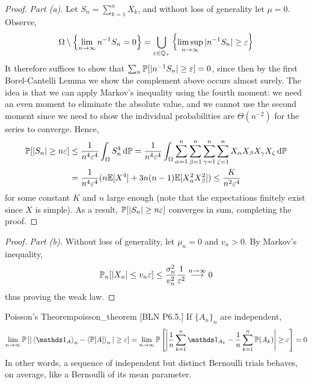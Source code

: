 \begin{proof}
    \textit{Part (a).} Let \(S_n = \sum_{k=1}^n X_k\), and without loss of generality let \(\mu = 0\). Observe, 
    \[
        \Omega \setminus \left\{\lim_{n \to \infty} n^{-1} S_n = 0\right\} 
        = \bigcup_{\varepsilon \in \mathbb{Q}_+} \left\{\limsup_{n \to \infty} |n^{-1} S_n| \geq \varepsilon \right\}
    \]
    It therefore suffices to show that \(\sum_n \mathbb{P}[|n^{-1} S_n| \geq \varepsilon] = 0\), since then by the first Borel-Cantelli Lemma we show the complement above occurs almost surely. The idea is that we can apply Markov's inequality using the fourth moment: we need an even moment to eliminate the absolute value, and we cannot use the second moment since we need to show the individual probabilities are \(\Theta(n^{-2})\) for the series to converge. Hence,
    \begin{align*}
        \mathbb{P}[|S_n| \geq n \varepsilon]
        &\leq \frac{1}{n^4 \varepsilon^4} \int_{\Omega} S_n^4 \, \mathrm{d}\mathbb{P} 
        = \frac{1}{n^4 \varepsilon^4} \int_{\Omega} \sum_{\alpha=1}^n \sum_{\beta=1}^n \sum_{\gamma=1}^n \sum_{\zeta=1}^n X_\alpha X_\beta X_\gamma X_\zeta \, \mathrm{d}\mathbb{P} \\
        &= \frac{1}{n^4 \varepsilon^4} (n \mathbb{E}[X^4] + 3n(n-1) \mathbb{E}[X_\alpha^2 X_\beta^2])
        \leq \frac{K}{n^2 \varepsilon^4}
    \end{align*}
    for some constant \(K\) and \(n\) large enough (note that the expectations finitely exist since \(X\) is simple). As a result, \(\mathbb{P}[|S_n| \geq n \varepsilon]\) converges in sum, completing the proof. 
\end{proof}

\begin{proof}
    \textit{Part (b).} Without loss of generality, let \(\mu_n = 0\) and \(v_n > 0\). By Markov's inequality, 
    \[
        \mathbb{P}_n[|X_n| \leq v_n \varepsilon]
        \leq \frac{\sigma_n^2}{v_n^2} \frac{1}{\varepsilon^2} \stackrel{n \to \infty}{\longrightarrow} 0
    \]
    thus proving the weak law. 
\end{proof}


\begin{problem}{Poisson's Theorem}{poisson_theorem}
    [BLN P6.5.] If \(\{A_n\}_n\) are independent,
    \[
        \lim_{n \to \infty} \bb{P}\left[ |\ev{\ds{1}_A}_n - \ev{\bb{P}[A]}_n | \geq \varepsilon \right]
        = \lim_{n \to \infty} \bb{P}\left[ \left| \frac{1}{n} \sum_{k=1}^n \ds{1}_{A_k} - \frac{1}{n} \sum_{k=1}^n \bb{P}(A_k) \right| \geq \varepsilon \right] 
        = 0
    \]
    In other words, a sequence of independent but distinct Bernoulli trials behaves, on average, like a Bernoulli of its mean parameter.
\end{problem}

